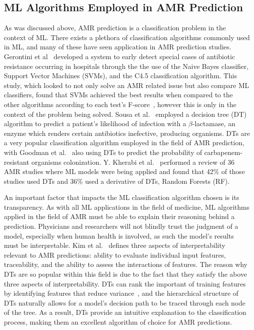 \documentclass[a4paper]{article}
\begin{document}
\subsection{ML Algorithms Employed in AMR Prediction}

As was discussed above, AMR prediction is a classification problem in the context of ML. There exists a plethora of classification algorithms commonly used in ML, and many of these have seen application in AMR prediction studies. Gerontini et al~\cite{gerontini_predictions_2011} developed a system to early detect special cases of antibiotic resistance occurring in hospitals through the the use of the Naive Bayes classifier, Support Vector Machines (SVMs), and the C4.5 classification algorithm. This study, which looked to not only solve an AMR related issue but also compare ML classifiers, found that SVMs achieved the best results when compared to the other algorithms according to each test's F-score~\cite{gerontini_predictions_2011}, however this is only in the context of the problem being solved. Sousa et al.~\cite{sousa_validation_2019} employed a decision tree (DT) algorithm to predict a patient's likelihood of infection with a $\beta$-lactamase, an enzyme which renders certain antibiotics inefective, producing organisms. DTs are a very popular classification algorithm employed in the field of AMR prediction, with Goodman et al.~\cite{goodman_predicting_2019} also using DTs to predict the probability of carbapenem-resistant organisms colonization. Y. Kherabi et al.~\cite{kherabi_machine_2024} performed a review of 36 AMR studies where ML models were being applied and found that 42\% of those studies used DTs and 36\% used a derivative of DTs, Random Forests (RF).  

An important factor that impacts the ML classification algorithm chosen is its transparency. As with all ML applications in the field of medicine, ML algorithms applied in the field of AMR must be able to explain their reasoning behind a prediction. Physicians and researchers will not blindly trust the judgment of a model, especially when human health is involved, as such the model's results must be interpretable. Kim et al.~\cite{kim_machine_2022} defines three aspects of interpretability relevant to AMR predictions: ability to evaluate individual input features, traceability, and the ability to assess the interactions of features. The reason why DTs are so popular within this field is due to the fact that they satisfy the above three aspects of interpretability. DTs can rank the important of training features by identifying features that reduce variance~\cite{kim_machine_2022}, and the hierarchical structure of DTs naturally allows for a model's decision path to be traced through each node of the tree. As a result, DTs provide an intuitive explanation to the classification process, making them an excellent algorithm of choice for AMR predictions. 
\end{document}
